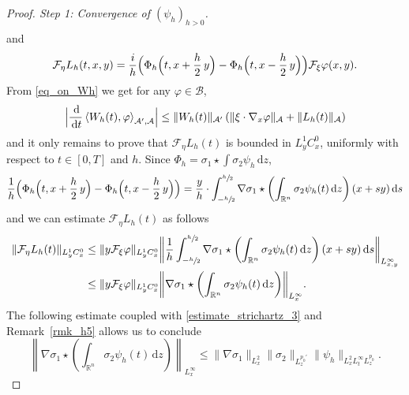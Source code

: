 \documentclass[11pt]{article}
\theoremstyle{definition}
\newcommand{\R}{\mathbb{R}}
\newcommand{\ud}{\, {\mathrm{d}}}
\begin{document}
\begin{proof}[Proof. Step 1: Convergence of $(\psi_{h})_{h>0}$]
\begin{align*}
\end{align*}
and
\[
\mathcal{F}_{\eta}L_{h}(t,x,y)=\frac{i}{h}\Bigl(\Phi_{h}\Bigl(t,x+\frac{h}{2}\,y\Bigr)-\Phi_{h}\Bigl(t,x-\frac{h}{2}\,y\Bigr)\Bigr)\mathcal{F}_{\xi}\varphi(x,y).
\]
From \eqref{eq_on_Wh} we get for any $\varphi\in\mathcal{B}$,
\[
\Bigl|\frac{\ud}{\ud t}\left\langle W_{h}(t),\varphi\right\rangle_{\mathcal{A}',\mathcal{A}}\Bigr|\leq\|W_{h}(t)\|_{\mathcal{A}'}\left(\|\xi\cdot\nabla_{x}\varphi\|_{\mathcal{A}}+\|L_{h}(t)\|_{\mathcal{A}}\right)
\]
and it only remains to prove that $\mathcal{F}_{\eta}L_{h}(t)$ is bounded in $L_{y}^{1}C_{x}^{0}$, uniformly with respect to $t\in[0,T]$ and $h$. Since $\Phi_{h}=\sigma_{1}\star\int\sigma_{2}\psi_{h}\ud z$,
\[
\frac{1}{h}\Bigl(\Phi_{h}\Bigl(t,x+\frac{h}{2}\,y\Bigr)-\Phi_{h}\Bigl(t,x-\frac{h}{2}\,y\Bigr)\Bigr)=\frac{y}{h}\cdot\int_{-\sfrac{h}{2}}^{\sfrac{h}{2}}\nabla\sigma_{1}\star\left(\int_{\R^{n}}\sigma_{2}\psi_{h}(t)\ud z\right)(x+sy)\ud s
\]
and we can estimate $\mathcal{F}_{\eta}L_{h}(t)$ as follows
\begin{align*}
\|\mathcal{F}_{\eta}L_{h}(t)\|_{L_{y}^{1}C_{x}^{0}}&\leq\|y\mathcal{F}_{\xi}\varphi\|_{L_{y}^{1}C_{x}^{0}}\biggl\|\frac{1}{h}\int_{-\sfrac{h}{2}}^{\sfrac{h}{2}}\nabla\sigma_{1}\star\left(\int_{\R^{n}}\sigma_{2}\psi_{h}(t)\ud z\right)(x+sy)\ud s\biggr\|_{L_{x,y}^{\infty}}\\
&\leq\|y\mathcal{F}_{\xi}\varphi\|_{L_{y}^{1}C_{x}^{0}}\biggl\|\nabla\sigma_{1}\star\left(\int_{\R^{n}}\sigma_{2}\psi_{h}(t)\ud z\right)\biggr\|_{L_{x}^{\infty}}.
\end{align*}
The following estimate coupled with \eqref{estimate_strichartz_3} and Remark~\ref{rmk_h5} allows us to conclude
\[
\left\|\nabla\sigma_{1}\star\left(\int_{\R^{n}}\sigma_{2}\psi_{h}(t)\ud z\right)\right\|_{L_{x}^{\infty}}\leq\|\nabla\sigma_{1}\|_{L_{x}^{2}}\|\sigma_{2}\|_{L_{z}^{p_{0}'}}\|\psi_{h}\|_{L_{x}^{2}L_{t}^{\infty}L_{z}^{p_{0}}}.
\]


\end{proof}
\end{document}
